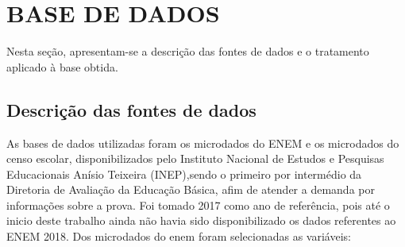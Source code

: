 \chapter[BASE DE DADOS]{BASE DE DADOS} %
Nesta seção, apresentam-se a descrição das fontes de dados e o tratamento aplicado à base obtida.
\section{Descrição das fontes de dados}
As bases de dados utilizadas foram os microdados do ENEM e os microdados do censo escolar, disponibilizados pelo Instituto Nacional de Estudos e Pesquisas Educacionais Anísio Teixeira (INEP),sendo o primeiro por intermédio da Diretoria de Avaliação da Educação Básica, afim de atender a demanda por informações sobre a prova. Foi tomado 2017 como ano de referência, pois até o inicio deste trabalho ainda não havia sido disponibilizado os dados referentes ao ENEM 2018.
Dos microdados do enem foram selecionadas as variáveis:
